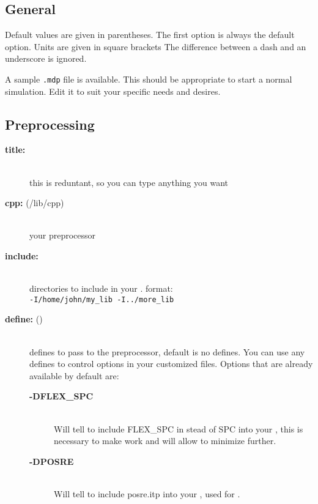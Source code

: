 \subsection{General}

Default values are given in parentheses. The first option is
always the default option. Units are given in square brackets The
difference between a dash and an underscore is ignored. 

A sample {\tt .mdp} file is
available. This should be appropriate to start a normal
simulation. Edit it to suit your specific needs and desires. 

\subsection{Preprocessing}
\begin{description}
\item[{\bf title:}]\mbox{}\\
this is reduntant, so you can type anything you want
\item[{\bf cpp: }(/lib/cpp)]\mbox{}\\
your preprocessor
\item[{\bf include:}]\mbox{}\\
directories to include in your . format: 
\\{\tt-I/home/john/my\_lib -I../more\_lib}\\
\item[{\bf define: }()]\mbox{}\\
defines to pass to the preprocessor, default is no defines. You can use
any defines to control options in your customized  files. Options
that are already available by default are:
\vspace{-2ex}\begin{description}
\item[{\bf -DFLEX\_SPC}]\mbox{}\\
Will tell  to include FLEX\_SPC in stead of SPC into your
, this is necessary to make 
{\bf {}} work and will allow 
{\bf {}} to minimize further.
\item[{\bf -DPOSRE}]\mbox{}\\
Will tell  to include posre.itp into your , used for
.
\end{description}
\end{description}

